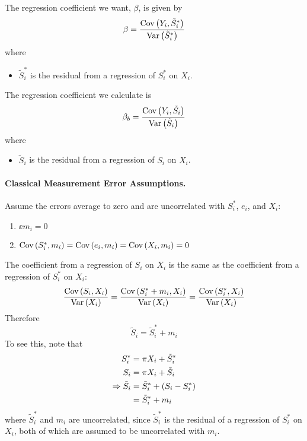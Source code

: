\documentclass[11pt]{article}
\begin{document}
The regression coefficient we want, $\beta$, is given by
\begin{equation}
	\beta = \frac{\text{Cov}\left( Y_i, \tilde{S}_i^* \right)}{\text{Var}\left( \tilde{S}_i^* \right)}
\end{equation}
where 
\begin{itemize}
	\item $\tilde{S}_i^*$ is the residual from a regression of $S_i^*$ on $X_i$. 
\end{itemize}

The regression coefficient we calculate is
\begin{equation}
	\beta_b = \frac{\text{Cov}\left( Y_i, \tilde{S}_i \right)}{\text{Var}\left( \tilde{S}_i \right)}
\end{equation}
where 
\begin{itemize}
	\item $\tilde{S}_i$ is the residual from a regression of $S_i$ on $X_i$. 
\end{itemize}

\paragraph*{Classical Measurement Error Assumptions.} Assume the errors average to zero and are uncorrelated with $S_i^*$, $e_i$, and $X_i$:
\begin{enumerate}
	\item $\ee{m_i} = 0$ 
	\item $\text{Cov}\left( S^*_i,m_i \right) = \text{Cov}\left( e_i,m_i \right) = \text{Cov}\left( X_i,m_i \right) = 0$
\end{enumerate}

The coefficient from a regression of $S_i$ on $X_i$ is the same as the coefficient from a regression of $S^*_i$ on $X_i$:
\begin{equation}
	\frac{\text{Cov}\left( S_i,X_i \right)}{\text{Var}\left( X_i \right)} = \frac{\text{Cov}\left( S_i^* + m_i, X_i \right)}{\text{Var}\left( X_i \right)} = \frac{\text{Cov}\left( S^*_i,X_i \right)}{\text{Var}\left( X_i \right)}
\end{equation}
Therefore
\begin{equation}
	\tilde{S}_i = \tilde{S}^*_i + m_i
\end{equation}
To see this, note that
\begin{align*}
	S^*_i &= \pi X_i + \tilde{S}^*_i \\
	S_i &= \pi X_i + \tilde{S}_i \\
	\Rightarrow \tilde{S}_i &= \tilde{S}^*_i + (S_i - S^*_i) \\
	&= \tilde{S}^*_i + m_i
\end{align*}
where $\tilde{S}^*_i$ and $m_i$ are uncorrelated, since $\tilde{S}^*_i$ is the residual of a regression of $S^*_i$ on $X_i$, both of which are assumed to be uncorrelated with $m_i$.
\end{document}
